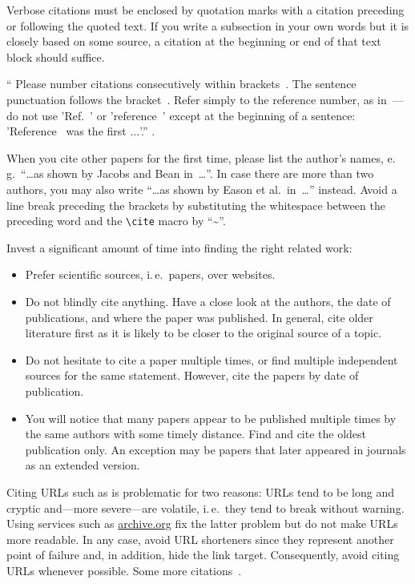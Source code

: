 Verbose citations must be enclosed by quotation marks with a citation
preceding or following the quoted text.
If you write a subsection in your own words but it is closely based on some
source, a citation at the beginning or end of that text block should suffice.

``%
Please number citations consecutively within brackets~\cite{b1}.
The sentence punctuation follows the bracket~\cite{b2}.
Refer simply to the reference number, as in~\cite{b3}---do not use
'Ref.~\cite{b3}' or 'reference~\cite{b3}' except at the beginning of a
sentence: 'Reference~\cite{b3} was the first $\ldots$'.'' \cite{b8}.

When you cite other papers for the first time, please list the author's names,
e.\,g.\ ``\ldots as shown by Jacobs and Bean in~\cite{b3}\ldots''.
In case there are more than two authors, you may also write ``\ldots as shown
by Eason et al.\ in~\cite{b1}\ldots'' instead.
Avoid a line break preceding the brackets by substituting the whitespace
between the preceding word and the \texttt{\textbackslash{}cite} macro by
``\textasciitilde{}''.

Invest a significant amount of time into finding the right related work:
\begin{itemize}
	\item Prefer scientific sources, i.\,e.\ papers, over websites.
	\item Do not blindly cite anything.
	Have a close look at the authors, the date of publications, and where the
	paper was published.
	In general, cite older literature first as it is likely to be closer to the
	original source of a topic.
	\item Do not hesitate to cite a paper multiple times, or find multiple
	independent sources for the same statement.
	However, cite the papers by date of publication.
	\item You will notice that many papers appear to be published multiple
	times by the same authors with some timely distance.
	Find and cite the oldest publication only.
	An exception may be papers that later appeared in journals as an extended
	version.
\end{itemize}

Citing URLs such as \cite{b9} is problematic for two reasons:
URLs tend to be long and cryptic and---more severe---are volatile, i.\,e.\,
they tend to break without warning.
Using services such as \url{archive.org} fix the latter problem but do not make
URLs more readable.
In any case, avoid URL shorteners since they represent another point of failure
and, in addition, hide the link target.
Consequently, avoid citing URLs whenever possible.
Some more citations~\cite{b4,b6,b7,b8,b9}.


